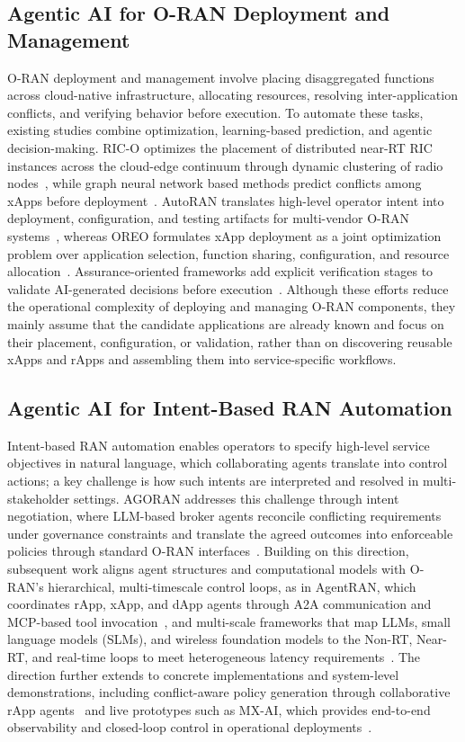 \documentclass[conference]{IEEEtran}
\begin{document}
\subsection{Agentic AI for O-RAN Deployment and Management}
O-RAN deployment and management involve placing disaggregated functions across cloud-native infrastructure, allocating resources, resolving inter-application conflicts, and verifying behavior before execution. To automate these tasks, existing studies combine optimization, learning-based prediction, and agentic decision-making. RIC-O optimizes the placement of distributed near-RT RIC instances across the cloud-edge continuum through dynamic clustering of radio nodes~\cite{almeida2023ric}, while graph neural network based methods predict conflicts among xApps before deployment~\cite{al2026ran}. AutoRAN translates high-level operator intent into deployment, configuration, and testing artifacts for multi-vendor O-RAN systems~\cite{maxenti2026autoran}, whereas OREO formulates xApp deployment as a joint optimization problem over application selection, function sharing, configuration, and resource allocation~\cite{mungari2025ran}. Assurance-oriented frameworks add explicit verification stages to validate AI-generated decisions before execution~\cite{singh2025agentic}. Although these efforts reduce the operational complexity of deploying and managing O-RAN components, they mainly assume that the candidate applications are already known and focus on their placement, configuration, or validation, rather than on discovering reusable xApps and rApps and assembling them into service-specific workflows.


\subsection{Agentic AI for Intent-Based RAN Automation}
Intent-based RAN automation enables operators to specify high-level service objectives in natural language, which collaborating agents translate into control actions; a key challenge is how such intents are interpreted and resolved in multi-stakeholder settings. AGORAN addresses this challenge through intent negotiation, where LLM-based broker agents reconcile conflicting requirements under governance constraints and translate the agreed outcomes into enforceable policies through standard O-RAN interfaces~\cite{chatzistefanidis2025agoran}.
Building on this direction, subsequent work aligns agent structures and computational models with O-RAN's hierarchical, multi-timescale control loops, as in AgentRAN, which coordinates rApp, xApp, and dApp agents through A2A communication and MCP-based tool invocation~\cite{elkael2026agentran}, and multi-scale frameworks that map LLMs, small language models (SLMs), and wireless foundation models to the Non-RT, Near-RT, and real-time loops to meet heterogeneous latency requirements~\cite{navidan2026toward}. The direction further extends to concrete implementations and system-level demonstrations, including conflict-aware policy generation through collaborative rApp agents~\cite{li2026multi,chatzimiltis2026agentic} and live prototypes such as MX-AI, which provides end-to-end observability and closed-loop control in operational deployments~\cite{chatzistefanidis2025mxai}.
\end{document}
